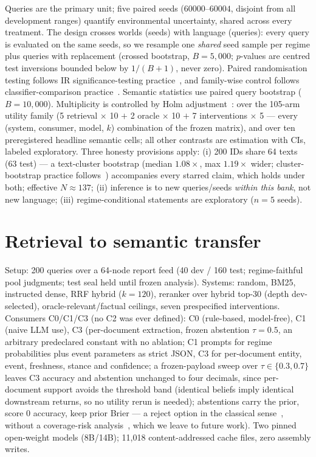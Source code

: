 \documentclass[runningheads]{llncs}
\begin{document}
Queries are the primary unit; five paired seeds ($60000$--$60004$, disjoint
from all development ranges) quantify environmental uncertainty, shared
across every treatment. The design crosses worlds (seeds) with language
(queries): every query is evaluated on the same seeds, so we resample one
\emph{shared} seed sample per regime plus queries with replacement
(crossed bootstrap, $B=5{,}000$; $p$-values are centred test inversions
bounded below by $1/(B+1)$, never zero). Paired randomisation testing
follows IR significance-testing practice~\cite{smucker2007comparison}, and
family-wise control follows classifier-comparison
practice~\cite{demsar2006statistical}. Semantic statistics use paired
query bootstrap ($B=10{,}000$). Multiplicity is controlled by Holm
adjustment~\cite{holm1979simple}: over the 105-arm utility family (5 retrieval $\times$ 10 $+$
2 oracle $\times$ 10 $+$ 7 interventions $\times$ 5 --- every
(system, consumer, model, $k$) combination of the frozen matrix), and over ten preregistered
headline semantic cells; all other contrasts are estimation with CIs,
labeled exploratory. Three honesty provisions apply: (i) 200 IDs share 64
texts (63 test) --- a text-cluster bootstrap (median $1.08\times$, max $1.19\times$ wider; cluster-bootstrap practice
follows~\cite{cameron2008bootstrap})
accompanies every starred claim, which holds under both; effective
$N\approx137$; (ii) inference is to new queries/seeds \emph{within this
bank}, not new language; (iii) regime-conditional statements are exploratory
($n=5$ seeds).

\section{Retrieval to semantic transfer}
\label{sec:transfer}

Setup: 200 queries over a 64-node report feed (40 dev / 160 test;
regime-faithful pool judgments; test seal held until frozen analysis).
Systems: random, BM25, instructed dense, RRF hybrid ($k=120$), reranker over
hybrid top-30 (depth dev-selected), oracle-relevant/factual ceilings, seven
prespecified interventions. Consumers C0/C1/C3 (no C2 was ever defined): C0
(rule-based, model-free), C1 (naive
LLM use), C3 (per-document extraction, frozen abstention $\tau=0.5$, an arbitrary
predeclared constant with no ablation; C1 prompts for regime probabilities
plus event parameters as strict JSON, C3 for per-document entity, event,
freshness, stance and confidence; a frozen-payload sweep over
$\tau\in\{0.3,0.7\}$ leaves C3 accuracy and abstention unchanged to four
decimals, since per-document support avoids the threshold band (identical
beliefs imply identical downstream returns, so no utility rerun is needed);
abstentions carry the prior, score $0$ accuracy, keep prior Brier --- a
reject option in the classical sense~\cite{chow1970optimum}, without a
coverage-risk analysis~\cite{geifman2019selectivenet}, which we leave to
future work). Two pinned open-weight
models (8B/14B); 11{,}018 content-addressed cache files, zero assembly writes.
\end{document}
